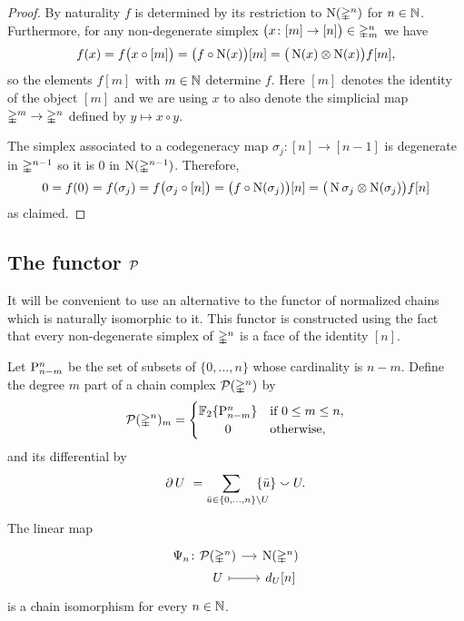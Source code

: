 \begin{proof}
	By naturality $f$ is determined by its restriction to $\chains(\simplex^n)$ for $n \in \N$.
	Furthermore, for any non-degenerate simplex $\big( x \colon [m] \to [n] \big) \in \simplex^n_m$ we have
	\[
	f(x) = f \big( x \circ [m] \big) =
	\big( f \circ \chains(x) \big) [m] =
	\big( \chains(x) \ot \chains(x) \big) f[m],
	\]
	so the elements $f[m]$ with $m \in \N$ determine $f$.
	Here $[m]$ denotes the identity of the object $[m]$ and we are using $x$ to also denote the simplicial map $\simplex^m \to \simplex^n$ defined by $y \mapsto x \circ y$.

	The simplex associated to a codegeneracy map $\sigma_j \colon [n] \to [n-1]$ is degenerate in $\simplex^{n-1}$ so it is $0$ in $\chains(\simplex^{n-1})$.
	Therefore,
	\[
	0 = f(0) = f(\sigma_j) =
	f \big( \sigma_j \circ [n] \big) =
	\big( f \circ \chains(\sigma_j) \big) [n] =
	\big( \chains \sigma_j \ot \chains(\sigma_j) \big) f[n]
	\]
	as claimed.
\end{proof}

\subsection{The functor $\cP$}

It will be convenient to use an alternative to the functor of normalized chains which is naturally isomorphic to it.
This functor is constructed using the fact that every non-degenerate simplex of $\simplex^n$ is a face of the identity $[n]$.

\begin{definition} \label{d:dual standard chains}
	Let $\P_{n-m}^n$ be the set of subsets of $\{0, \dots, n\}$ whose cardinality is $n-m$.
	Define the degree $m$ part of a chain complex $\cP(\simplex^n)$ by
	\[
	\cP(\simplex^n)_m = \begin{cases}
	\F\{\P_{n-m}^n\} & \text{if } 0 \leq m \leq n, \\
	\hfil 0 & \text{otherwise},
	\end{cases}
	\]
	and its differential by
	\begin{equation} \label{e:boundary of P(simplex)}
	\bd U \ =
	\sum_{\bar u \in \{0, \dots, n\} \setminus U \kern-10pt} \{\bar u\} \union U.
	\end{equation}
\end{definition}

\begin{lemma}
	The linear map
	\[
	\begin{tikzcd} [column sep=small, row sep=0]
	\Psi_n \colon &[-20pt] \cP(\simplex^n) \arrow[r] & \chains(\simplex^n) \\
	& U \arrow[r, mapsto] & d_U [n]
	\end{tikzcd}
	\]
	is a chain isomorphism for every $n \in \N$.
\end{lemma}

